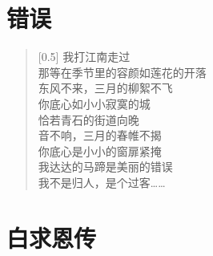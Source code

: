 \documentclass[12pt,UTF-8,openany]{ctexbook}
\begin{document}
\chapter{错误}

\begin{large}
    
    \begin{verse}[0.5\linewidth]
        我打江南走过 \\
        那等在季节里的容颜如莲花的开落 \\
        东风不来，三月的柳絮不飞 \\
        你底心如小小寂寞的城 \\
        恰若青石的街道向晚 \\
        音不响，三月的春帷不揭 \\
        你底心是小小的窗扉紧掩 \\
        我达达的马蹄是美丽的错误 \\
        我不是归人，是个过客……
    \end{verse}
    
\end{large}



\chapter{白求恩传}
\end{document}
